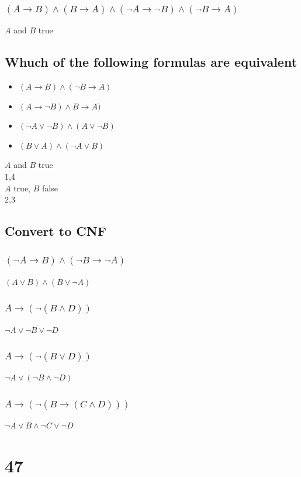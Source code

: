 \documentclass[12pt, a4paper]{article}
\begin{document}
			\subsubsection{$(A\rightarrow B) \land (B\rightarrow A)\land (\neg A\rightarrow \neg B)\land (\neg B\rightarrow A)$}
				$A$ and $B$ true
		\subsection{Whuch of the following formulas are equivalent}
			\begin{itemize}
				\item $(A\rightarrow B)\land (\neg B \rightarrow A)$
				\item $(A\rightarrow \neg B)\land B\rightarrow A)$
				\item $(\neg A\lor \neg B)\land (A\lor\neg B)$
				\item $(B\lor A)\land (\neg A \lor B)$
			\end{itemize}
			$A$ and $B$ true\\
			1,4\\
			$A$ true, $B$ false\\
			2,3\\
		\subsection{Convert to CNF}
			\subsubsection{$(\neg A\rightarrow B)\land (\neg B\rightarrow \neg A)$}
				$(A\lor B)\land (B\lor \neg A)$
			\subsubsection{$A\rightarrow (\neg(B\land D))$}
				$\neg A\lor \neg B\lor \neg D$
			\subsubsection{$A\rightarrow(\neg(B\lor D))$}
				$\neg A\lor (\neg B \land \neg D)$
			\subsubsection{$A\rightarrow (\neg(B\rightarrow(C\land D)))$}
				$\neg A \lor B \land \neg C\lor \neg D$
	\section{47}
\end{document}
